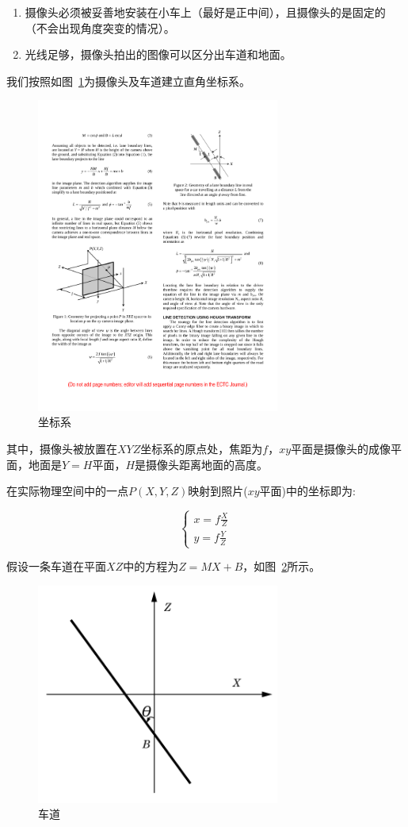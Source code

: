 \documentclass[11pt]{article}
\begin{document}
\begin{enumerate}
  \item[(1)] 摄像头必须被妥善地安装在小车上（最好是正中间），且摄像头的是固定的（不会出现角度突变的情况）。
  \item[(2)] 光线足够，摄像头拍出的图像可以区分出车道和地面。
\end{enumerate}

我们按照如图~\ref{fig:coordinate-system}为摄像头及车道建立直角坐标系。

\begin{figure}[h!]
	\centering
	\includegraphics[width=8cm]{Graphs/coordinate-system}
	\caption{坐标系}
	\label{fig:coordinate-system}
\end{figure}

其中，摄像头被放置在$XYZ$坐标系的原点处，焦距为$f$，$xy$平面是摄像头的成像平面，地面是$Y=H$平面，$H$是摄像头距离地面的高度。

在实际物理空间中的一点$P(X,Y,Z)$映射到照片($xy$平面)中的坐标即为:

$$
\begin{cases}
  x = f \frac{X}{Z} \\
  y = f \frac{Y}{Z}
\end{cases}
$$

假设一条车道在平面$XZ$中的方程为$Z = MX + B$，如图~\ref{fig:lane}所示。

\begin{figure}[h!]
	\centering
	\includegraphics[width=8cm]{Graphs/lane}
	\caption{车道}
	\label{fig:lane}
\end{figure}
\end{document}
